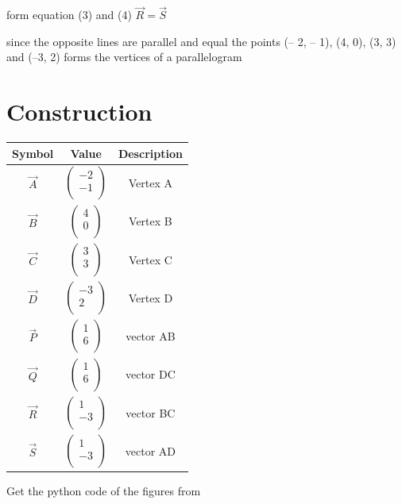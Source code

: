 \documentclass[journal,12pt,twocolumn]{IEEEtran}
\begin{document}
form equation (3) and (4) $\vec{R} = \vec{S}$
\vspace{0.2cm}

since the opposite lines are parallel and equal the points (– 2, – 1), (4, 0), (3, 3) and (–3, 2) forms the vertices of a parallelogram

\section*{Construction}
\centering
\vspace{0.2cm}
{
\setlength\extrarowheight{2pt}
\begin{tabular}{|c|c|c|}
	\hline
	\textbf{Symbol}&\textbf{Value}&\textbf{Description}\\
	\hline
	$\vec{A}$ & $\begin{pmatrix}-2 \\ -1 \\ \end{pmatrix}$ & Vertex A\\
	\hline
	$\vec{B}$ & $\begin{pmatrix}4 \\ 0 \\ \end{pmatrix}$ & Vertex B\\
	\hline
	$\vec{C}$& $\begin{pmatrix}3 \\ 3 \\ \end{pmatrix}$ & Vertex C\\
	\hline
	$\vec{D}$ & $\begin{pmatrix}-3 \\ 2 \\ \end{pmatrix}$ & Vertex D\\
	\hline
	$\vec{P}$ &$\begin{pmatrix}1 \\ 6 \\ \end{pmatrix}$&vector AB\\
	\hline
	$\vec{Q}$ &$\begin{pmatrix}1 \\ 6 \\ \end{pmatrix}$&vector DC\\
	\hline
	$\vec{R}$ &$\begin{pmatrix}1 \\ -3 \\ \end{pmatrix}$&vector BC\\
	\hline
	$\vec{S}$ &$\begin{pmatrix}1 \\ -3 \\ \end{pmatrix}$&vector AD\\
	\hline
\end{tabular}
}

\vspace{0.6cm}
Get the python code of the figures from
\begin{table}[h]
\large
\centering
{}


\end{table}
\end{document}
